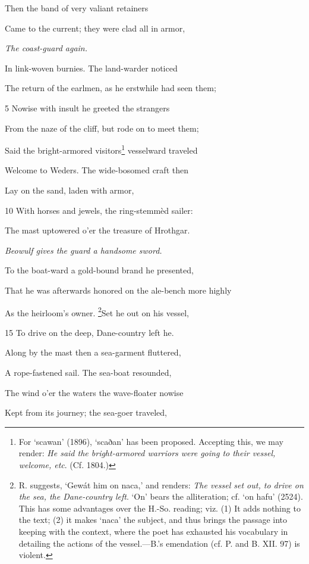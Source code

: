 
Then the band of very valiant retainers

Came to the current; they were clad all in armor,

\emph{The coast-guard
again.}

In link-woven burnies. The land-warder noticed

The return of the earlmen, as he erstwhile had seen them;

5
Nowise with insult he greeted the strangers

From the naze of the cliff, but rode on to meet them;

Said the bright-armored visitors\footnote{For ‘scawan’ (1896), ‘scaðan’ has been proposed. Accepting this, we
may render: \emph{He said the bright-armored warriors were going to their vessel,
welcome, etc}. (Cf. 1804.)} vesselward traveled

Welcome to Weders. The wide-bosomed craft then

Lay on the sand, laden with armor,

10
With horses and jewels, the ring-stemmèd sailer:

The mast uptowered o’er the treasure of Hrothgar.

\emph{Beowulf gives the
guard a handsome
sword.}

To the boat-ward a gold-bound brand he presented,

That he was afterwards honored on the ale-bench more highly

As the heirloom’s owner. \footnote{R. suggests, ‘Gewát him on naca,’ and renders: \emph{The vessel set out, to
drive on the sea, the Dane-country left}. ‘On’ bears the alliteration; cf. ‘on
hafu’ (2524). This has some advantages over the H.-So. reading; viz.
(1) It adds nothing to the text; (2) it makes ‘naca’ the subject, and thus
brings the passage into keeping with the context, where the poet has exhausted
his vocabulary in detailing the actions of the vessel.—B.’s emendation
(cf. P. and B. XII. 97) is violent.}Set he out on his vessel,

15
To drive on the deep, Dane-country left he.

Along by the mast then a sea-garment fluttered,

A rope-fastened sail. The sea-boat resounded,

The wind o’er the waters the wave-floater nowise

Kept from its journey; the sea-goer traveled,

